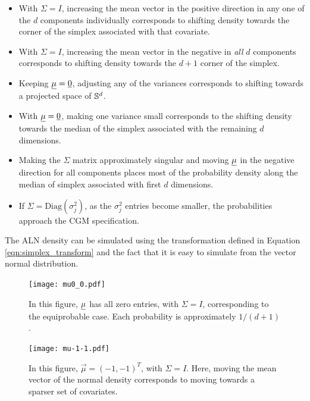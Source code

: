 \begin{itemize}
\item With $\Sigma=I$, increasing the mean vector in the positive direction in any one of the $d$ components individually corresponds to shifting density towards the corner of the simplex associated with that covariate. 
\item With $\Sigma=I$, increasing the mean vector in the negative in \emph{all} $d$ components corresponds to shifting density towards the $d+1$ corner of the simplex. 
\item Keeping $\underline{\mu} =\underline{{0}}$, adjusting any of the variances corresponds to shifting towards a projected space of $\mathbb{S}^{d}$. 
\item With $\underline{\mu} =\underline{{0}}$, making one variance small corresponds to the shifting density towards the median of the simplex associated with the remaining $d$ dimensions. 
\item Making the $\Sigma$ matrix approximately singular and moving $\underline{\mu}$ in the negative direction for all components places most of the probability density along the median of simplex associated with first $d$ dimensions. 
\item If $\Sigma = \text{Diag}(\sigma^2_j)$, as the $\sigma^2_j$ entries become smaller, the probabilities approach the CGM specification.    
\end{itemize}

The ALN density can be simulated using the transformation defined in Equation \ref{eqn:simplex_transform} and the fact that it is easy to simulate from the vector normal distribution. 

\begin{figure}[ht]
\begin{minipage}[b]{0.45\linewidth}
\centering
\texttt{[image: mu0\_0.pdf]}
\caption[ALN plot with a zero mean vector]{In this figure, $\underline{\mu}$ has all zero entries, with $\Sigma=I$, corresponding to the equiprobable case. Each probability is approximately $1/(d+1)$. }
\label{fig:figure9}
\end{minipage}
\hspace{0.5cm}
\begin{minipage}[b]{0.45\linewidth}
\centering

\texttt{[image: mu-1-1.pdf]}
\caption[ALN plot with a negative one mean vector]{In this figure, $\vec{\mu}=(-1,-1)^T$, with $\Sigma=I$. Here, moving the mean vector of the normal density  corresponds to moving towards a sparser set of covariates. }
\label{fig:figure10}
\end{minipage}
\end{figure}

